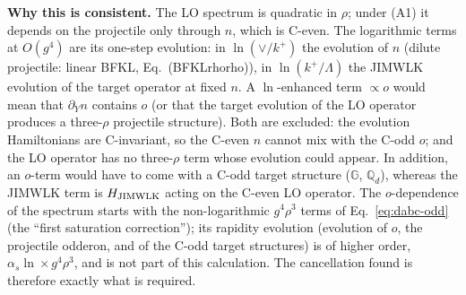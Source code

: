 \documentclass[10pt]{article}
\def\mf#1{\mathbb{#1}}
\begin{document}
\noindent\textbf{Why this is consistent.} The LO spectrum is quadratic in $\rho$; under (A1) it depends on the projectile only through $n$, which is C-even. The logarithmic terms at $O(g^{4})$ are its one-step evolution: in $\ln(\vee/k^{+})$ the evolution of $n$ (dilute projectile: linear BFKL, Eq.~(BFKLrhorho)), in $\ln(k^{+}/\Lambda)$ the JIMWLK evolution of the target operator at fixed $n$. A $\ln$-enhanced term $\propto o$ would mean that $\partial_{Y}n$ contains $o$ (or that the target evolution of the LO operator produces a three-$\rho$ projectile structure). Both are excluded: the evolution Hamiltonians are C-invariant, so the C-even $n$ cannot mix with the C-odd $o$; and the LO operator has no three-$\rho$ term whose evolution could appear. In addition, an $o$-term would have to come with a C-odd target structure ($\mf{G}$, $\mf{Q}_{d}$), whereas the JIMWLK term is $H_{\rm JIMWLK}$ acting on the C-even LO operator. The $o$-dependence of the spectrum starts with the non-logarithmic $g^{4}\rho^{3}$ terms of Eq.~\eqref{eq:dabc-odd} (the ``first saturation correction''); its rapidity evolution (evolution of $o$, the projectile odderon, and of the C-odd target structures) is of higher order, $\alpha_{s}\ln\times g^{4}\rho^{3}$, and is not part of this calculation. The cancellation found is therefore exactly what is required.
\end{document}

